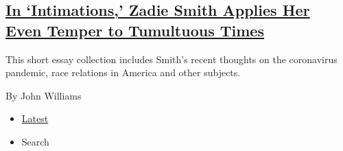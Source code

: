 \begin{enumerate}
{  \subsection{\texorpdfstring{\href{/2020/07/22/books/review-intimations-essays-zadie-smith.html}{In
  `Intimations,' Zadie Smith Applies Her Even Temper to Tumultuous
  Times}}{In `Intimations,' Zadie Smith Applies Her Even Temper to Tumultuous Times}}\label{in-intimations-zadie-smith-applies-her-even-temper-to-tumultuous-times}}

  This short essay collection includes Smith's recent thoughts on the
  coronavirus pandemic, race relations in America and other subjects.

  By John Williams
\end{enumerate}

\begin{itemize}
\tightlist
\item
  \protect\hyperlink{stream-panel}{Latest}
\item
  Search
\end{itemize}

